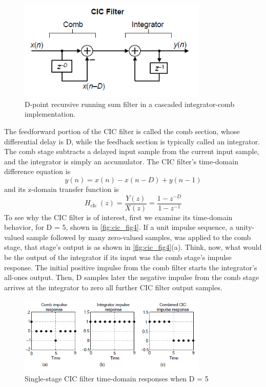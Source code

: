 \begin{figure}[!ht]
    \centering
    \includegraphics[width=0.8\textwidth]{images/CIC_Filter/CIC_digital_filters_fig3.png}
    \caption{D-point recursive running sum filter in a cascaded integrator-comb implementation.}
    \label{fig:cic_fig3}
\end{figure}

The feedforward portion of the CIC filter is called the comb section, whose differential delay is D, while the feedback section is typically called an integrator. The comb stage subtracts a delayed input sample from the current input sample, and the integrator is simply an accumulator. The CIC filter's time-domain difference equation is 
\begin{equation}
y(n)=x(n)-x(n-D)+y(n-1)
\end{equation}
and its z-domain transfer function is 
\begin{equation}
H_{\text {cIc }}(z)=\frac{Y(z)}{X(z)}=\frac{1-z^{-D}}{1-z^{-1}}
\end{equation}
To see why the CIC filter is of interest, first we examine its time-domain behavior, for D = 5, shown in \autoref{fig:cic_fig4}. If a unit impulse sequence, a unity-valued sample followed by many zero-valued samples, was applied to the comb stage, that stage's output is as shown in \autoref{fig:cic_fig4}(a). Think, now, what would be the output of the integrator if its input was the comb stage's impulse response. The initial positive impulse from the comb filter starts the integrator's all-ones output. Then, D samples later the negative impulse from the comb stage arrives at the integrator to zero all further CIC filter output samples. 

\begin{figure}[!ht]
    \centering
    \includegraphics[width=0.8\textwidth]{images/CIC_Filter/CIC_digital_filters_fig4.png}
    \caption{Single-stage CIC filter time-domain responses when D = 5}
    \label{fig:cic_fig4}
\end{figure}

